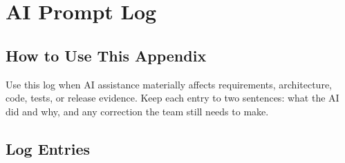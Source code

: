 \chapter{AI Prompt Log}

\section{How to Use This Appendix}
Use this log when AI assistance materially affects requirements, architecture, code, tests, or release evidence. Keep each entry to two sentences: what the AI did and why, and any correction the team still needs to make.

\section{Log Entries}

